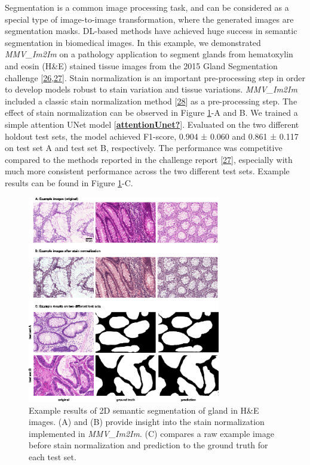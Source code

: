 Segmentation is a common image processing task, and can be considered as a special type of image-to-image transformation, where the generated images are segmentation masks. DL-based methods have achieved huge success in semantic segmentation in biomedical images. In this example, we demonstrated \emph{MMV\_Im2Im} on a pathology application to segment glands from hematoxylin and eosin (H\&E) stained tissue images from the 2015 Gland Segmentation challenge {[}\protect\hyperlink{ref-45Sirz1X}{26},\protect\hyperlink{ref-XAffSYIR}{27}{]}. Stain normalization is an important pre-processing step in order to develop models robust to stain variation and tissue variations. \emph{MMV\_Im2Im} included a classic stain normalization method {[}\protect\hyperlink{ref-tQhnZyjK}{28}{]} as a pre-processing step. The effect of stain normalization can be observed in Figure \ref{fig:2d_gland}-A and B. We trained a simple attention UNet model {[}\protect\hyperlink{ref-attentionUnet}{\textbf{attentionUnet?}}{]}. Evaluated on the two different holdout test sets, the model achieved F1-score, 0.904 ± 0.060 and 0.861 ± 0.117 on test set A and test set B, respectively. The performance was competitive compared to the methods reported in the challenge report {[}\protect\hyperlink{ref-XAffSYIR}{27}{]}, especially with much more consistent performance across the two different test sets. Example results can be found in Figure \ref{fig:2d_gland}-C.

\begin{figure}
\hypertarget{fig:2d_gland}{%
\centering
\includegraphics[width=0.75\textwidth,height=\textheight]{images/2d_semantic_seg_justin.png}
\caption{Example results of 2D semantic segmentation of gland in H\&E images. (A) and (B) provide insight into the stain normalization implemented in \emph{MMV\_Im2Im}. (C) compares a raw example image before stain normalization and prediction to the ground truth for each test set.}\label{fig:2d_gland}
}
\end{figure}


